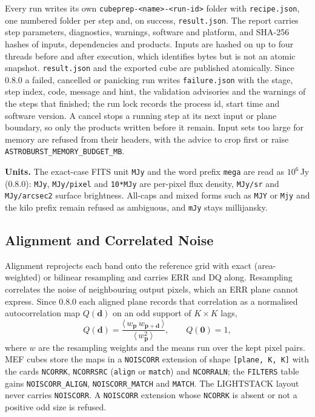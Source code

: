 \documentclass[11pt,a4paper]{article}
\newcommand{\code}[1]{\texttt{\small #1}}
\begin{document}
    Every run writes its own \code{cubeprep-<name>-<run-id>} folder with \code{recipe.json}, one numbered folder per step and, on success, \code{result.json}. The report carries step parameters, diagnostics, warnings, software and platform, and SHA-256 hashes of inputs, dependencies and products. Inputs are hashed on up to four threads before and after execution, which identifies bytes but is not an atomic snapshot. \code{result.json} and the exported cube are published atomically. Since 0.8.0 a failed, cancelled or panicking run writes \code{failure.json} with the stage, step index, code, message and hint, the validation advisories and the warnings of the steps that finished; the run lock records the process id, start time and software version. A cancel stops a running step at its next input or plane boundary, so only the products written before it remain. Input sets too large for memory are refused from their headers, with the advice to crop first or raise \code{ASTROBURST\_MEMORY\_BUDGET\_MB}.

    \textbf{Units.} The exact-case FITS unit \code{MJy} and the word prefix \code{mega} are read as $10^{6}$\,Jy (0.8.0): \code{MJy}, \code{MJy/pixel} and \code{10*MJy} are per-pixel flux density, \code{MJy/sr} and \code{MJy/arcsec2} surface brightness. All-caps and mixed forms such as \code{MJY} or \code{Mjy} and the kilo prefix remain refused as ambiguous, and \code{mJy} stays millijansky.

    \subsection{Alignment and Correlated Noise}
    \label{sec:noiscorr}

    Alignment reprojects each band onto the reference grid with exact (area-weighted) or bilinear resampling and carries ERR and DQ along. Resampling correlates the noise of neighbouring output pixels, which an ERR plane cannot express. Since 0.8.0 each aligned plane records that correlation as a normalised autocorrelation map $Q(\mathbf{d})$ on an odd support of $K \times K$ lags,
    \begin{equation}
        Q(\mathbf{d}) = \frac{\langle\, w_{\mathbf{p}}\, w_{\mathbf{p}+\mathbf{d}} \,\rangle}{\langle\, w_{\mathbf{p}}^{2} \,\rangle},
        \qquad Q(\mathbf{0}) = 1,
    \end{equation}
    where $w$ are the resampling weights and the means run over the kept pixel pairs. MEF cubes store the maps in a \code{NOISCORR} extension of shape \code{[plane, K, K]} with the cards \code{NCORRK}, \code{NCORRSRC} (\code{align} or \code{match}) and \code{NCORRALN}; the \code{FILTERS} table gains \code{NOISCORR\_ALIGN}, \code{NOISCORR\_MATCH} and \code{MATCH}. The LIGHTSTACK layout never carries \code{NOISCORR}. A \code{NOISCORR} extension whose \code{NCORRK} is absent or not a positive odd size is refused.
\end{document}
